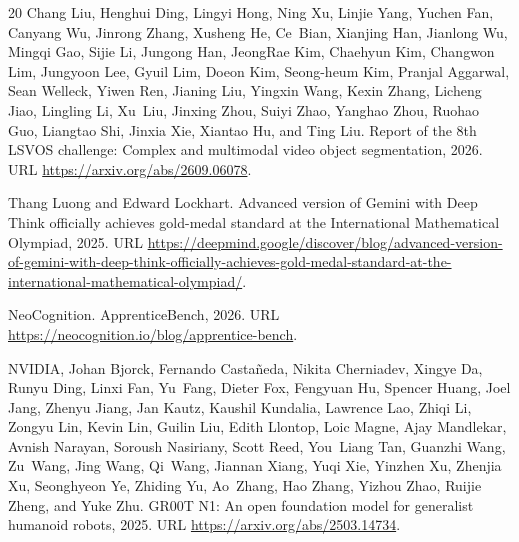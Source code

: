 \documentclass{article}
\begin{document}
\begin{thebibliography}{20}
Chang Liu, Henghui Ding, Lingyi Hong, Ning Xu, Linjie Yang, Yuchen Fan, Canyang Wu, Jinrong Zhang, Xusheng He, Ce~Bian, Xianjing Han, Jianlong Wu, Mingqi Gao, Sijie Li, Jungong Han, JeongRae Kim, Chaehyun Kim, Changwon Lim, Jungyoon Lee, Gyuil Lim, Doeon Kim, Seong-heum Kim, Pranjal Aggarwal, Sean Welleck, Yiwen Ren, Jianing Liu, Yingxin Wang, Kexin Zhang, Licheng Jiao, Lingling Li, Xu~Liu, Jinxing Zhou, Suiyi Zhao, Yanghao Zhou, Ruohao Guo, Liangtao Shi, Jinxia Xie, Xiantao Hu, and Ting Liu.
\newblock Report of the 8th LSVOS challenge: Complex and multimodal video object segmentation, 2026.
\newblock URL \url{https://arxiv.org/abs/2609.06078}.

Thang Luong and Edward Lockhart.
\newblock Advanced version of Gemini with Deep Think officially achieves gold-medal standard at the International Mathematical Olympiad, 2025.
\newblock URL \url{https://deepmind.google/discover/blog/advanced-version-of-gemini-with-deep-think-officially-achieves-gold-medal-standard-at-the-international-mathematical-olympiad/}.

NeoCognition.
\newblock ApprenticeBench, 2026.
\newblock URL \url{https://neocognition.io/blog/apprentice-bench}.

NVIDIA, Johan Bjorck, Fernando Casta{\~n}eda, Nikita Cherniadev, Xingye Da, Runyu Ding, Linxi Fan, Yu~Fang, Dieter Fox, Fengyuan Hu, Spencer Huang, Joel Jang, Zhenyu Jiang, Jan Kautz, Kaushil Kundalia, Lawrence Lao, Zhiqi Li, Zongyu Lin, Kevin Lin, Guilin Liu, Edith Llontop, Loic Magne, Ajay Mandlekar, Avnish Narayan, Soroush Nasiriany, Scott Reed, You~Liang Tan, Guanzhi Wang, Zu~Wang, Jing Wang, Qi~Wang, Jiannan Xiang, Yuqi Xie, Yinzhen Xu, Zhenjia Xu, Seonghyeon Ye, Zhiding Yu, Ao~Zhang, Hao Zhang, Yizhou Zhao, Ruijie Zheng, and Yuke Zhu.
\newblock GR00T N1: An open foundation model for generalist humanoid robots, 2025.
\newblock URL \url{https://arxiv.org/abs/2503.14734}.


\end{thebibliography}
\end{document}
